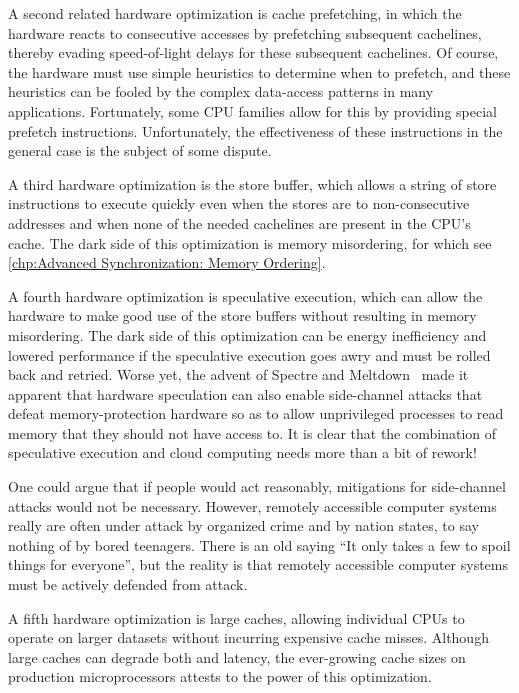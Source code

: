 A second related hardware optimization is cache prefetching, in which
the hardware reacts to consecutive accesses by prefetching subsequent
cachelines, thereby evading speed-of-light delays for these
subsequent cachelines.
Of course, the hardware must use simple heuristics to determine when
to prefetch, and these heuristics can be fooled by the complex data-access
patterns in many applications.
Fortunately, some CPU families allow for this by providing special
prefetch instructions.
Unfortunately, the effectiveness of these instructions in the general
case is the subject of some dispute.

A third hardware optimization is the store buffer, which allows a string
of store instructions to execute quickly even when the stores are to
non-consecutive addresses and when none of the needed cachelines are
present in the CPU's cache.
The dark side of this optimization is memory misordering, for which see
\cref{chp:Advanced Synchronization: Memory Ordering}.

A fourth hardware optimization is speculative execution, which can
allow the hardware to make good use of the store buffers without
resulting in memory misordering.
The dark side of this optimization can be energy inefficiency and
lowered performance if the speculative execution goes awry and must
be rolled back and retried.
Worse yet, the advent of
Spectre and Meltdown~\cite{JannHorn2018MeltdownSpectre}
made it apparent that hardware speculation can also enable side-channel
attacks that defeat memory-protection hardware so as to allow unprivileged
processes to read memory that they should not have access to.
It is clear that the combination of speculative execution and cloud
computing needs more than a bit of rework!

One could argue that if people would act reasonably, mitigations for
side-channel attacks would not be necessary.
However, remotely accessible computer systems really are often under
attack by organized crime and by nation states, to say nothing of by
bored teenagers.
There is an old saying ``It only takes a few to spoil things for
everyone'', but the reality is that remotely accessible computer systems
must be actively defended from attack.

A fifth hardware optimization is large caches, allowing individual
CPUs to operate on larger datasets without incurring expensive cache
misses.
Although large caches can degrade both  and
 {latency}, the ever-growing cache sizes on production
microprocessors attests to the power of this optimization.

